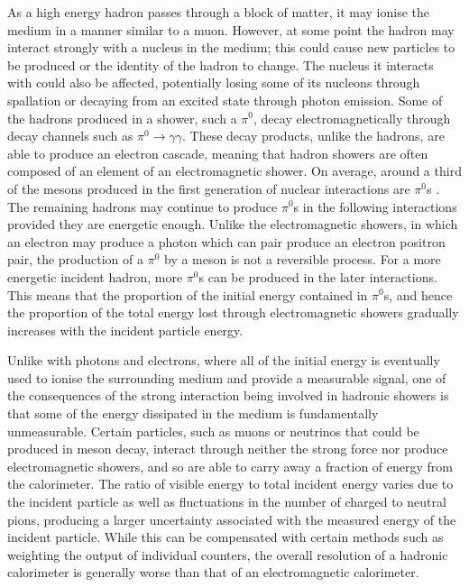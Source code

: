 \documentclass{article}
\begin{document}
As a high energy hadron passes through a block of matter, it may ionise the medium in a manner similar to a muon. However, at some point the hadron may interact strongly with a nucleus in the medium; this could cause new particles to be produced or the identity of the hadron to change. The nucleus it interacts with could also be affected, potentially losing some of its nucleons through spallation or decaying from an excited state through photon emission. Some of the hadrons produced in a shower, such a $\pi^0$, decay electromagnetically through decay channels such as $\pi^0\rightarrow\gamma\gamma$. These decay products, unlike the hadrons, are able to produce an electron cascade, meaning that hadron showers are often composed of an element of an electromagnetic shower. On average, around a third of the mesons produced in the first generation of nuclear interactions are $\pi^0$s \cite{CalorimetryWigmans}. The remaining hadrons may continue to produce $\pi^0$s in the following interactions provided they are energetic enough. Unlike the electromagnetic showers, in which an electron may produce a photon which can pair produce an electron positron pair, the production of a $\pi^0$ by a meson is not a reversible process. For a more energetic incident hadron, more $\pi^0$s can be produced in the later interactions. This means that the proportion of the initial energy contained in $\pi^0$s, and hence the proportion of the total energy lost through electromagnetic showers gradually increases with the incident particle energy.

Unlike with photons and electrons, where all of the initial energy is eventually used to ionise the surrounding medium and provide a measurable signal, one of the consequences of the strong interaction being involved in hadronic showers is that some of the energy dissipated in the medium is fundamentally unmeasurable. Certain particles, such as muons or neutrinos that could be produced in meson decay, interact through neither the strong force nor produce electromagnetic showers, and so are able to carry away a fraction of energy from the calorimeter. The ratio of visible energy to total incident energy varies due to the incident particle as well as fluctuations in the number of charged to neutral pions, producing a larger uncertainty associated with the measured energy of the incident particle. While this can be compensated with certain methods such as weighting the output of individual counters, the overall resolution of a hadronic calorimeter is generally worse than that of an electromagnetic calorimeter.
\end{document}
